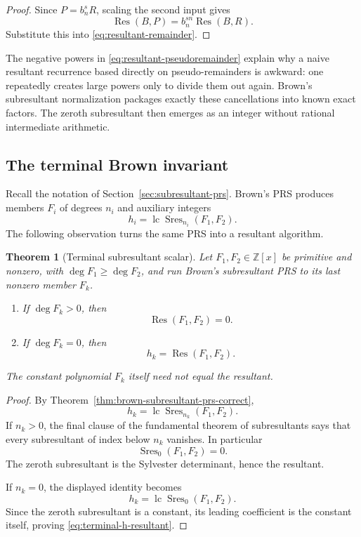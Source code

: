 \documentclass[11pt]{book}
\newtheorem{theorem}{Theorem}[section]
\theoremstyle{definition}
\newcommand{\ZZ}{\mathbb Z}
\begin{document}
\begin{proof}
Since $P=b_n^sR$, scaling the second input gives
\[
 \operatorname{Res}(B,P)=b_n^{sn}\operatorname{Res}(B,R).
\]
Substitute this into \eqref{eq:resultant-remainder}.
\end{proof}

The negative powers in \eqref{eq:resultant-pseudoremainder} explain why a
naive resultant recurrence based directly on pseudo-remainders is awkward:
one repeatedly creates large powers only to divide them out again.  Brown's
subresultant normalization packages exactly these cancellations into known
exact factors.  The zeroth subresultant then emerges as an integer without
rational intermediate arithmetic.

\subsection{The terminal Brown invariant}

Recall the notation of Section~\ref{sec:subresultant-prs}.  Brown's PRS
produces members $F_i$ of degrees $n_i$ and auxiliary integers
\[
 h_i=\operatorname{lc}\operatorname{Sres}_{n_i}(F_1,F_2).
\]
The following observation turns the same PRS into a resultant algorithm.

\begin{theorem}[Terminal subresultant scalar]\label{thm:terminal-resultant}
Let $F_1,F_2\in\ZZ[x]$ be primitive and nonzero, with
$\deg F_1\ge\deg F_2$, and run Brown's subresultant PRS to its last nonzero
member $F_k$.
\begin{enumerate}
 \item If $\deg F_k>0$, then
 \[
  \operatorname{Res}(F_1,F_2)=0.
 \]
 \item If $\deg F_k=0$, then
 \begin{equation}\label{eq:terminal-h-resultant}
  h_k=\operatorname{Res}(F_1,F_2).
 \end{equation}
\end{enumerate}
The constant polynomial $F_k$ itself need not equal the resultant.
\end{theorem}

\begin{proof}
By Theorem~\ref{thm:brown-subresultant-prs-correct},
\[
 h_k=\operatorname{lc}\operatorname{Sres}_{n_k}(F_1,F_2).
\]
If $n_k>0$, the final clause of the fundamental theorem of subresultants says
that every subresultant of index below $n_k$ vanishes.  In particular
\[
 \operatorname{Sres}_0(F_1,F_2)=0.
\]
The zeroth subresultant is the Sylvester determinant, hence the resultant.

If $n_k=0$, the displayed identity becomes
\[
 h_k=\operatorname{lc}\operatorname{Sres}_0(F_1,F_2).
\]
Since the zeroth subresultant is a constant, its leading coefficient is the
constant itself, proving \eqref{eq:terminal-h-resultant}.
\end{proof}
\end{document}
